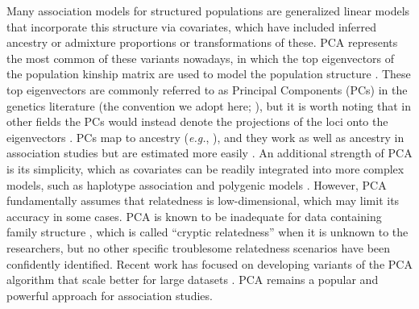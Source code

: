 \documentclass[11pt]{article}
\begin{document}
Many association models for structured populations are generalized linear models that incorporate this structure via covariates, which have included inferred ancestry or admixture proportions \citep{pritchard_association_2000} or transformations of these.
PCA represents the most common of these variants nowadays, in which the top eigenvectors of the population kinship matrix are used to model the population structure \citep{zhang_semiparametric_2003, price_principal_2006, bouaziz_accounting_2011}.
These top eigenvectors are commonly referred to as Principal Components (PCs) in the genetics literature (the convention we adopt here; \cite{patterson_population_2006}), but it is worth noting that in other fields the PCs would instead denote the projections of the loci onto the eigenvectors \citep{jolliffe_principal_2002}.
PCs map to ancestry (\textit{e.g.}, \cite{alexander_fast_2009, zhou_strong_2016}), and they work as well as ancestry in association studies but are estimated more easily \citep{patterson_population_2006, zhao_arabidopsis_2007, alexander_fast_2009, bouaziz_accounting_2011}.
An additional strength of PCA is its simplicity, which as covariates can be readily integrated into more complex models, such as haplotype association \citep{xu_detecting_2014} and polygenic models \citep{qian_fast_2020}.
However, PCA fundamentally assumes that relatedness is low-dimensional, which may limit its accuracy in some cases.
PCA is known to be inadequate for data containing family structure \citep{patterson_population_2006, thornton_roadtrips:_2010, price_new_2010}, which is called ``cryptic relatedness'' when it is unknown to the researchers, but no other specific troublesome relatedness scenarios have been confidently identified.
Recent work has focused on developing variants of the PCA algorithm that scale better for large datasets \citep{lee_sparse_2012, abraham_fast_2014, galinsky_fast_2016, abraham_flashpca2:_2017, agrawal_scalable_2020}.
PCA remains a popular and powerful approach for association studies.
\end{document}
